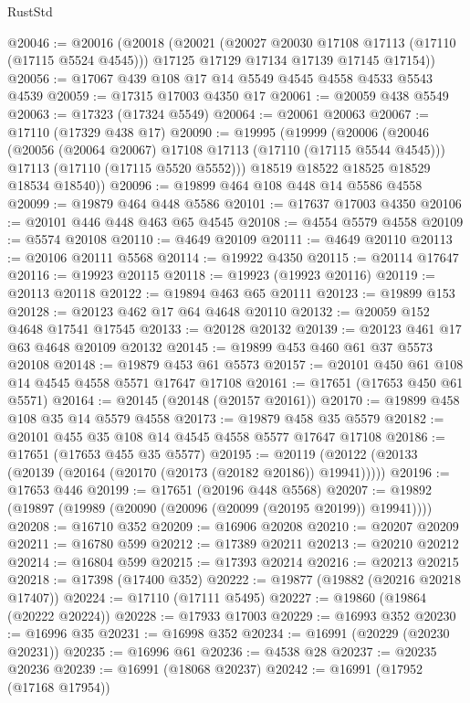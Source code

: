 \begin{lexlean}{RustStd}
\begin{coremodule}
@20046 := @20016
    (@20018
      (@20021
        (@20027 @20030 @17108 @17113 (@17110 (@17115 @5524 @4545)))
        @17125
        @17129
        @17134
        @17139
        @17145
        @17154))
@20056 := @17067 @439 @108 @17 @14 @5549 @4545 @4558 @4533 @5543 @4539
@20059 := @17315 @17003 @4350 @17
@20061 := @20059 @438 @5549
@20063 := @17323 (@17324 @5549)
@20064 := @20061 @20063
@20067 := @17110 (@17329 @438 @17)
@20090 := @19995
    (@19999
      (@20006
        (@20046
          (@20056 (@20064 @20067) @17108 @17113 (@17110 (@17115 @5544 @4545)))
          @17113
          (@17110 (@17115 @5520 @5552)))
        @18519
        @18522
        @18525
        @18529
        @18534
        @18540))
@20096 := @19899 @464 @108 @448 @14 @5586 @4558
@20099 := @19879 @464 @448 @5586
@20101 := @17637 @17003 @4350
@20106 := @20101 @446 @448 @463 @65 @4545
@20108 := @4554 @5579 @4558
@20109 := @5574 @20108
@20110 := @4649 @20109
@20111 := @4649 @20110
@20113 := @20106 @20111 @5568
@20114 := @19922 @4350
@20115 := @20114 @17647
@20116 := @19923 @20115
@20118 := @19923 (@19923 @20116)
@20119 := @20113 @20118
@20122 := @19894 @463 @65 @20111
@20123 := @19899 @153
@20128 := @20123 @462 @17 @64 @4648 @20110
@20132 := @20059 @152 @4648 @17541 @17545
@20133 := @20128 @20132
@20139 := @20123 @461 @17 @63 @4648 @20109 @20132
@20145 := @19899 @453 @460 @61 @37 @5573 @20108
@20148 := @19879 @453 @61 @5573
@20157 := @20101 @450 @61 @108 @14 @4545 @4558 @5571 @17647 @17108
@20161 := @17651 (@17653 @450 @61 @5571)
@20164 := @20145 (@20148 (@20157 @20161))
@20170 := @19899 @458 @108 @35 @14 @5579 @4558
@20173 := @19879 @458 @35 @5579
@20182 := @20101 @455 @35 @108 @14 @4545 @4558 @5577 @17647 @17108
@20186 := @17651 (@17653 @455 @35 @5577)
@20195 := @20119 (@20122 (@20133 (@20139 (@20164 (@20170 (@20173 (@20182 @20186)) @19941)))))
@20196 := @17653 @446
@20199 := @17651 (@20196 @448 @5568)
@20207 := @19892 (@19897 (@19989 (@20090 (@20096 (@20099 (@20195 @20199)) @19941))))
@20208 := @16710 @352
@20209 := @16906 @20208
@20210 := @20207 @20209
@20211 := @16780 @599
@20212 := @17389 @20211
@20213 := @20210 @20212
@20214 := @16804 @599
@20215 := @17393 @20214
@20216 := @20213 @20215
@20218 := @17398 (@17400 @352)
@20222 := @19877 (@19882 (@20216 @20218 @17407))
@20224 := @17110 (@17111 @5495)
@20227 := @19860 (@19864 (@20222 @20224))
@20228 := @17933 @17003
@20229 := @16993 @352
@20230 := @16996 @35
@20231 := @16998 @352
@20234 := @16991 (@20229 (@20230 @20231))
@20235 := @16996 @61
@20236 := @4538 @28
@20237 := @20235 @20236
@20239 := @16991 (@18068 @20237)
@20242 := @16991 (@17952 (@17168 @17954))

\end{coremodule}
\end{lexlean}
